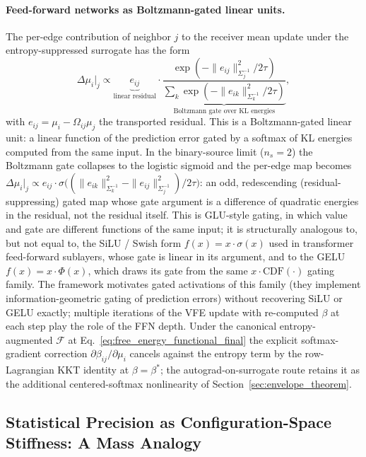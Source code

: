 \documentclass[11pt]{article}
\begin{document}
\paragraph{Feed-forward networks as Boltzmann-gated linear units.}
The per-edge contribution of neighbor $j$ to the receiver mean update under the entropy-suppressed surrogate has the form
\begin{equation}
\Delta\mu_i\big|_j \propto \underbrace{e_{ij}}_{\text{linear residual}} \cdot \underbrace{\frac{\exp(-\|e_{ij}\|^2_{\Sigma_j^{-1}} / 2\tau)}{\sum_k \exp(-\|e_{ik}\|^2_{\Sigma_k^{-1}}/2\tau)}}_{\text{Boltzmann gate over KL energies}},
\label{eq:vfe_glu}
\end{equation}
with $e_{ij} = \mu_i - \Omega_{ij}\mu_j$ the transported residual. This is a Boltzmann-gated linear unit: a linear function of the prediction error gated by a softmax of KL energies computed from the same input. In the binary-source limit ($n_s = 2$) the Boltzmann gate collapses to the logistic sigmoid and the per-edge map becomes $\Delta\mu_i\big|_j \propto e_{ij}\cdot\sigma\big((\|e_{ik}\|^2_{\Sigma_k^{-1}} - \|e_{ij}\|^2_{\Sigma_j^{-1}})/2\tau\big)$: an odd, redescending (residual-suppressing) gated map whose gate argument is a difference of quadratic energies in the residual, not the residual itself. This is GLU-style gating, in which value and gate are different functions of the same input; it is structurally analogous to, but not equal to, the SiLU / Swish form $f(x) = x\cdot\sigma(x)$ used in transformer feed-forward sublayers, whose gate is linear in its argument, and to the GELU $f(x) = x\cdot\Phi(x)$, which draws its gate from the same $x\cdot\mathrm{CDF}(\cdot)$ gating family. The framework motivates gated activations of this family (they implement information-geometric gating of prediction errors) without recovering SiLU or GELU exactly; multiple iterations of the VFE update with re-computed $\beta$ at each step play the role of the FFN depth. Under the canonical entropy-augmented $\mathcal{F}$ at Eq.~\eqref{eq:free_energy_functional_final} the explicit softmax-gradient correction $\partial\beta_{ij}/\partial\mu_i$ cancels against the entropy term by the row-Lagrangian KKT identity at $\beta = \beta^*$; the autograd-on-surrogate route retains it as the additional centered-softmax nonlinearity of Section~\ref{sec:envelope_theorem}.

\subsection{Statistical Precision as Configuration-Space Stiffness: A Mass Analogy}
\label{sec:mass}
\end{document}
